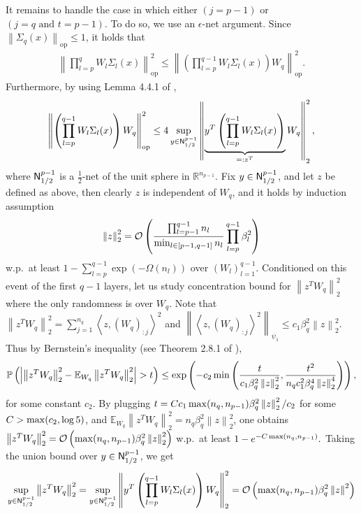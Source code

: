 \documentclass[11pt]{article}
\def\RR{\mathbb{R}}
\newcommand{\E}{\mathbb{E}}
\newcommand{\bigO}[1]{\mathcal{O}\left(#1\right)}
\newcommand{\bigOmg}[1]{\Omega\left(#1\right)}
\newcommand{\inner}[1]{\left\langle#1\right\rangle}
\newcommand{\bigexp}[1]{\exp\left(#1\right)}
\newcommand{\norm}[1]{\left\|#1\right\|}
\newcommand{\abs}[1]{\left|#1\right|}
\def\Bernstein{Theorem 2.8.1 of \cite{vershynin2018high}}
\def\op{\mathrm{op}}
\def\PP{\mathbb{P}}
\def\min{\mathop{\rm min}\nolimits}
\def\max{\mathop{\rm max}\nolimits}
\begin{document}
    It remains to handle the case in which either $(j=p-1)$ or $(j=q \textrm{ and } t=p-1)$. 
    To do so, we use an $\epsilon$-net argument.  
    Since $\norm{\Sigma_q(x)}_{\op}\leq 1$, it holds that
    \begin{align}\label{eq:scase}
	\norm{\prod_{l=p}^{q} W_l\Sigma_l(x)}_{\op}^2 
	\leq\norm{\left(\prod_{l=p}^{q-1} W_l\Sigma_l(x)\right) W_q}_{\op}^2.
    \end{align}
    Furthermore, by using Lemma 4.4.1 of \citep{vershynin2018high},
    \begin{align}\label{eq:scase2}
	\norm{\left(\prod_{l=p}^{q-1} W_l\Sigma_l(x)\right) W_q}_{\op}^2
	\leq 4 \sup_{y\in{\sf N}_{1/2}^{p-1}} \norm{\underbrace{y^T \left(\prod_{l=p}^{q-1} W_l\Sigma_l(x)\right)}_{=:z^T} W_q}_2^2,
    \end{align}
    where ${\sf N}_{1/2}^{p-1}$ is a $\frac{1}{2}$-net of the unit sphere in $\RR^{n_{p-1}}.$ 
    Fix $y\in {\sf N}_{1/2}^{p-1}$, and let $z$ be defined as above, then clearly $z$ is independent of $W_q$, and it holds by induction assumption
    \begin{align}\label{eq:sz}
	\norm{z}_2^2=\bigO{ \frac{\prod_{l=p-1}^{q-1} n_l}{\min_{l\in[p-1,q-1]}n_l} \prod_{l=p}^{q-1}\beta_l^2 }
    \end{align}
    w.p.\ at least $1-\sum_{l=p}^{q-1} \bigexp{-\bigOmg{n_l}}$ over $(W_l)_{l=1}^{q-1}.$
    Conditioned on this event of the first $q-1$ layers, 
    let us study concentration bound for $\norm{z^TW_q}_2^2$ where the only randomness is over $W_q.$
    Note that $\norm{z^T W_q}_2^2=\sum_{j=1}^{n_q} \inner{z,(W_q)_{:j}}^2$ 
    and $\norm{\inner{z,(W_q)_{:j}}^2}_{\psi_1}\leq c_1\beta_q^2\norm{z}_2^2.$
    Thus by Bernstein's inequality (see \Bernstein),
    \begin{align*}
	\PP\left(\abs{\norm{z^T W_q}_2^2-\E_{W_q}\norm{z^T W_q}_2^2}>t\right)
	\leq\bigexp{-c_2\min\left(\frac{t}{c_1\beta_q^2\norm{z}_2^2}, \frac{t^2}{n_q c_1^2\beta_q^4\norm{z}_2^4}\right)},
    \end{align*}
    for some constant $c_2$. 
    By plugging $t=C c_1 \max(n_q, n_{p-1})\beta_q^2\norm{z}_2^2/c_2$ for some $C>\max(c_2,\log 5)$, 
    and $\E_{W_q}\norm{z^T W_q}_2^2=n_q\beta_q^2\norm{z}_2^2$, 
    one obtains $\norm{z^T W_q}_2^2=\bigO{ \max(n_q,n_{p-1})\beta_q^2\norm{z}_2^2}$
    w.p.\ at least $1-e^{-C\max(n_q,n_{p-1})}.$
    Taking the union bound over $y\in{\sf N}_{1/2}^{p-1}$, 
    we get 
    \begin{align*}
	\sup_{y\in{\sf N}_{1/2}^{p-1}} \norm{z^T W_q}_2^2
	=\sup_{y\in{\sf N}_{1/2}^{p-1}} \norm{y^T \left(\prod_{l=p}^{q-1} W_l\Sigma_l(x)\right) W_q}_2^2 
	=\bigO{ \max(n_q,n_{p-1})\beta_q^2\norm{z}^2}
    \end{align*}
\end{document}
